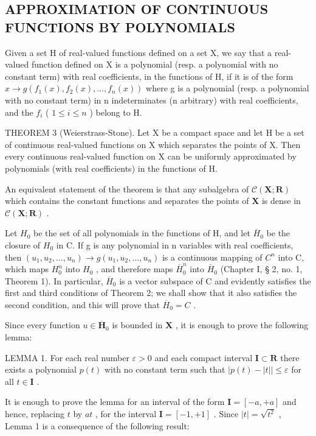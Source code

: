 \subsection{APPROXIMATION OF CONTINUOUS FUNCTIONS BY POLYNOMIALS}

Given a set H of real-valued functions defined on a set X, we say that a real-valued function defined on X is a polynomial (resp. a polynomial with no constant term) with real coefficients, in the functions of H, if it is of the form \(x \to g(f_{1}(x), f_{2}(x), \ldots, f_{n}(x))\) where g is a polynomial (resp. a polynomial with no constant term) in n indeterminates (n arbitrary) with real coefficients, and the \(f_{i}\) ( \(1 \leqslant i \leqslant n\) ) belong to H.

THEOREM 3 (Weierstrass-Stone). Let X be a compact space and let H be a set of continuous real-valued functions on X which separates the points of X. Then every continuous real-valued function on X can be uniformly approximated by polynomials (with real coefficients) in the functions of H.

An equivalent statement of the theorem is that any subalgebra of \(\mathcal{C}(\mathbf{X};\mathbf{R})\) which contains the constant functions and separates the points of \(\mathbf{X}\) is dense in \(\mathcal{C}(\mathbf{X};\mathbf{R})\) .

Let \(H_{0}\) be the set of all polynomials in the functions of H, and let \(\overline{H}_{0}\) be the closure of \(H_{0}\) in C. If g is any polynomial in n variables with real coefficients, then \((u_{1}, u_{2}, \ldots, u_{n}) \to g(u_{1}, u_{2}, \ldots, u_{n})\) is a continuous mapping of \(C^{n}\) into C, which maps \(H_{0}^{n}\) into \(H_{0}\) , and therefore maps \(\overline{H}_{0}^{n}\) into \(\overline{H}_{0}\) (Chapter I, § 2, no. 1, Theorem 1). In particular, \(\overline{H}_{0}\) is a vector subspace of C and evidently satisfies the first and third conditions of Theorem 2; we shall show that it also satisfies the second condition, and this will prove that \(\overline{H}_{0} = C\) .

Since every function \(u \in \overline{\mathbf{H}}_0\) is bounded in \(\mathbf{X}\) , it is enough to prove the following lemma:

LEMMA 1. For each real number \(\varepsilon > 0\) and each compact interval \(\mathbf{I} \subset \mathbf{R}\) there exists a polynomial \(p(t)\) with no constant term such that \(|p(t) - |t|| \leqslant \varepsilon\) for all \(t \in \mathbf{I}\) .

It is enough to prove the lemma for an interval of the form \(\mathbf{I} = [-a, +a]\) and hence, replacing \(t\) by \(at\) , for the interval \(\mathbf{I} = [-1, +1]\) . Since \(|t| = \sqrt{t^2}\) , Lemma 1 is a consequence of the following result:


